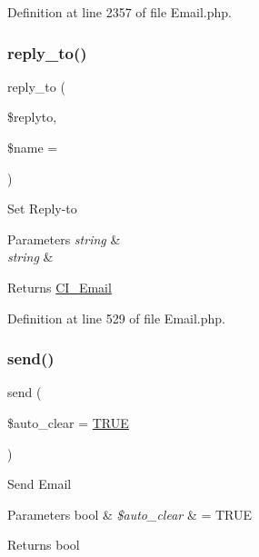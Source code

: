 Definition at line 2357 of file Email.\+php.

\mbox{\label{class_c_i___email_a1ee2303dece90d5b3afbb5dc75b9a0ca}} 
\subsubsection{\texorpdfstring{reply\_to()}{reply\_to()}}
{\footnotesize\ttfamily reply\+\_\+to (\begin{DoxyParamCaption}\item[{}]{\$replyto,  }\item[{}]{\$name = {\ttfamily \textquotesingle{}\textquotesingle{}} }\end{DoxyParamCaption})}

Set Reply-\/to


\begin{DoxyParams}{Parameters}
{\em string} & \\
\hline
{\em string} & \\
\hline
\end{DoxyParams}
\begin{DoxyReturn}{Returns}
\mbox{\hyperlink{class_c_i___email}{C\+I\+\_\+\+Email}} 
\end{DoxyReturn}


Definition at line 529 of file Email.\+php.

\mbox{\label{class_c_i___email_a547a65a81ba2d1f98cc15121a45dab11}} 
\subsubsection{\texorpdfstring{send()}{send()}}
{\footnotesize\ttfamily send (\begin{DoxyParamCaption}\item[{}]{\$auto\+\_\+clear = {\ttfamily \mbox{\hyperlink{constants_8php_ae04a3efe6aa42044f803ee90c2277846}{T\+R\+UE}}} }\end{DoxyParamCaption})}

Send Email


\begin{DoxyParams}[1]{Parameters}
bool & {\em \$auto\+\_\+clear} & = T\+R\+UE \\
\hline
\end{DoxyParams}
\begin{DoxyReturn}{Returns}
bool 
\end{DoxyReturn}


